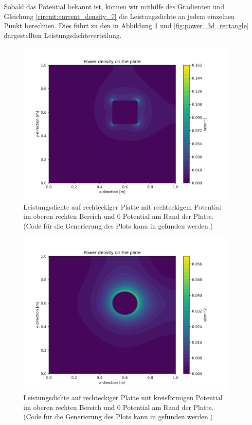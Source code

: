 Sobald das Potential bekannt ist, können wir mithilfe des Gradienten und Gleichung \eqref{circuit:current_density_7} die Leistungsdichte an jedem einzelnen Punkt berechnen. Dies führt zu den in Abbildung \ref{fig:power_2d} und \ref{fig:power_3d_rectangle} dargestellten Leistungsdichteverteilung.
\begin{figure}[h]
	\centering
	\includegraphics[width=0.99\textwidth]{papers/circuit/power_distribution.png}
	\caption{Leistungsdichte auf rechteckiger Platte mit rechteckigem Potential im oberen rechten Bereich und 0 Potential am Rand der Platte. (Code für die Generierung des Plots kann in \cite{github:AndreasFMueller} gefunden werden.)}
	\label{fig:power_2d}
\end{figure}
\begin{figure}[h]
	\centering
	\includegraphics[width=0.99\textwidth]{papers/circuit/power_distribution_circle.png}
	\caption{Leistungsdichte auf rechteckiger Platte mit kreisförmigen Potential im oberen rechten Bereich und 0 Potential am Rand der Platte. (Code für die Generierung des Plots kann in \cite{github:AndreasFMueller} gefunden werden.)}
	\label{fig:power_2d_circle}
\end{figure}
